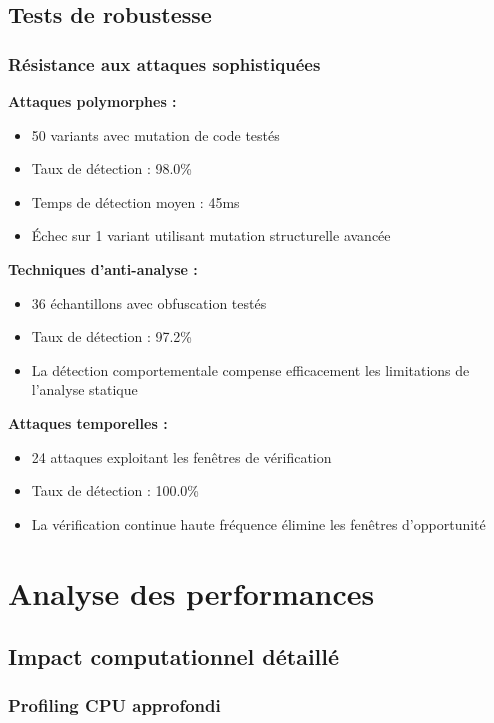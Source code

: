 \subsection{Tests de robustesse}

\subsubsection{Résistance aux attaques sophistiquées}

\textbf{Attaques polymorphes :} 
\begin{itemize}
    \item 50 variants avec mutation de code testés
    \item Taux de détection : 98.0\%
    \item Temps de détection moyen : 45ms
    \item Échec sur 1 variant utilisant mutation structurelle avancée
\end{itemize}

\textbf{Techniques d'anti-analyse :}
\begin{itemize}
    \item 36 échantillons avec obfuscation testés
    \item Taux de détection : 97.2\%
    \item La détection comportementale compense efficacement les limitations de l'analyse statique
\end{itemize}

\textbf{Attaques temporelles :}
\begin{itemize}
    \item 24 attaques exploitant les fenêtres de vérification
    \item Taux de détection : 100.0\%
    \item La vérification continue haute fréquence élimine les fenêtres d'opportunité
\end{itemize}

\section{Analyse des performances}

\subsection{Impact computationnel détaillé}

\subsubsection{Profiling CPU approfondi}

